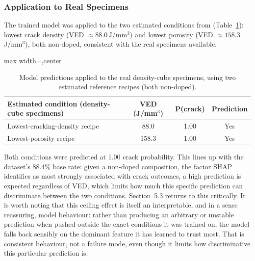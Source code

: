 \documentclass[a4paper]{article}
\newcommand{\sz}[1]{\fpeval{#1*\bodysize/14}}     %
\renewcommand{\small}{\fontsize{\sz{11.7}}{\sz{15.6}}\selectfont}
\begin{document}
\subsubsection{Application to Real Specimens}
The trained model was applied to the two estimated conditions from \citet{marchese2020} (Table~\ref{tab:specimen}): lowest crack density (VED $\approx 88.0$\,J/mm$^3$) and lowest porosity (VED $\approx 158.3$\,J/mm$^3$), both non-doped, consistent with the real specimens available.

\begin{table}[t]
\centering
\small
\begin{adjustbox}{max width=\textwidth,center}
\begin{tabular}{lccc}
\toprule
Estimated condition (density-cube specimens) & VED (J/mm$^3$) & P(crack) & Prediction \\
\midrule
Lowest-cracking-density recipe \citep{marchese2020} & 88.0 & 1.00 & Yes \\
Lowest-porosity recipe \citep{marchese2020} & 158.3 & 1.00 & Yes \\
\bottomrule
\end{tabular}
\end{adjustbox}
\caption{Model predictions applied to the real density-cube specimens, using two estimated reference recipes (both non-doped).}
\label{tab:specimen}
\end{table}

Both conditions were predicted at 1.00 crack probability. This lines up with the dataset's 88.4\% base rate: given a non-doped composition, the factor SHAP identifies as most strongly associated with crack outcomes, a high prediction is expected regardless of VED, which limits how much this specific prediction can discriminate between the two conditions. Section~5.3 returns to this critically. It is worth noting that this ceiling effect is itself an interpretable, and in a sense reassuring, model behaviour: rather than producing an arbitrary or unstable prediction when pushed outside the exact conditions it was trained on, the model falls back sensibly on the dominant feature it has learned to trust most. That is consistent behaviour, not a failure mode, even though it limits how discriminative this particular prediction is.
\end{document}
